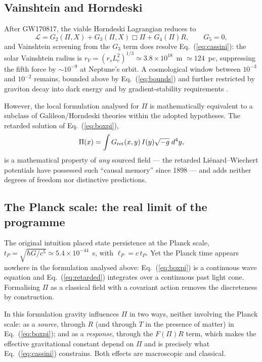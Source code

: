 \documentclass[aps,prd,twocolumn,superscriptaddress,nofootinbib,floatfix]{revtex4-2}
\begin{document}
\subsection{Vainshtein and Horndeski}
\label{sec:horndeski}

After GW170817, the viable Horndeski Lagrangian reduces to
%
\begin{equation}
\mathcal{L}=G_2(\Pi,X)+G_3(\Pi,X)\Box\Pi+G_4(\Pi)R,
\qquad G_5=0,
\label{eq:horndeski}
\end{equation}
%
and Vainshtein screening \cite{Vainshtein1972} from the $G_3$ term does
resolve Eq.~(\ref{eq:cassini}): the solar Vainshtein radius is
$r_V=(r_s L_c^2)^{1/3}\simeq3.8\times10^{18}$~m $\simeq124$~pc,
suppressing the fifth force by $\sim10^{-9}$ at Neptune's orbit. A
cosmological window between $10^{-3}$ and $10^{-2}$ remains, bounded
above by Eq.~(\ref{eq:bounds}) and further restricted by graviton decay
into dark energy \cite{Creminelli2018} and by gradient-stability
requirements \cite{Kobayashi2019}.

However, the local formulation analysed for $\Pi$ is mathematically
equivalent to a subclass of Galileon/Horndeski theories
\cite{Deffayet2009} within the adopted hypotheses. The retarded
solution of Eq.~(\ref{eq:boxpi}),
%
\begin{equation}
\Pi(x)=\int G_{\rm ret}(x,y)\,I(y)\sqrt{-g}\;d^4y,
\label{eq:retarded}
\end{equation}
%
is a mathematical property of \emph{any} sourced field --- the retarded
Li\'enard--Wiechert potentials have possessed such ``causal memory''
since 1898 --- and adds neither degrees of freedom nor distinctive
predictions.

\subsection{The Planck scale: the real limit of the programme}
\label{sec:planck}

The original intuition placed state persistence at the Planck scale,
$t_P=\sqrt{\hbar G/c^5}\simeq5.4\times10^{-44}$~s, with
$\ell_P=c\,t_P$. Yet the Planck time appears nowhere in the formulation
analysed above: Eq.~(\ref{eq:boxpi}) is a continuous wave equation and
Eq.~(\ref{eq:retarded}) integrates over a continuous past light cone.
Formalising $\Pi$ as a classical field with a covariant action removes
the discreteness by construction.

In this formulation gravity influences $\Pi$ in two ways, neither
involving the Planck scale: as a \emph{source}, through $R$ (and
through $T$ in the presence of matter) in Eq.~(\ref{eq:boxpi}); and as a
\emph{response}, through the $F(\Pi)R$ term, which makes the effective
gravitational constant depend on $\Pi$ and is precisely what
Eq.~(\ref{eq:cassini}) constrains. Both effects are macroscopic and
classical.
\end{document}
